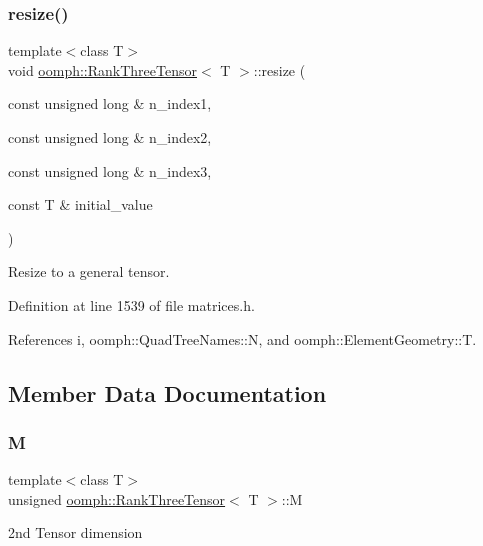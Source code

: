 \subsubsection{\texorpdfstring{resize()}{resize()}\hspace{0.1cm}{\footnotesize\ttfamily [3/3]}}
{\footnotesize\ttfamily template$<$class T$>$ \\
void \hyperlink{classoomph_1_1RankThreeTensor}{oomph\+::\+Rank\+Three\+Tensor}$<$ T $>$\+::resize (\begin{DoxyParamCaption}\item[{const unsigned long \&}]{n\+\_\+index1,  }\item[{const unsigned long \&}]{n\+\_\+index2,  }\item[{const unsigned long \&}]{n\+\_\+index3,  }\item[{const T \&}]{initial\+\_\+value }\end{DoxyParamCaption})\hspace{0.3cm}{\ttfamily [inline]}}



Resize to a general tensor. 



Definition at line 1539 of file matrices.\+h.



References i, oomph\+::\+Quad\+Tree\+Names\+::N, and oomph\+::\+Element\+Geometry\+::T.



\subsection{Member Data Documentation}
\mbox{\label{classoomph_1_1RankThreeTensor_a9e28da9e2862c47f2f5562742202748d}} 
\subsubsection{\texorpdfstring{M}{M}}
{\footnotesize\ttfamily template$<$class T$>$ \\
unsigned \hyperlink{classoomph_1_1RankThreeTensor}{oomph\+::\+Rank\+Three\+Tensor}$<$ T $>$\+::M\hspace{0.3cm}{\ttfamily [private]}}



2nd Tensor dimension 



